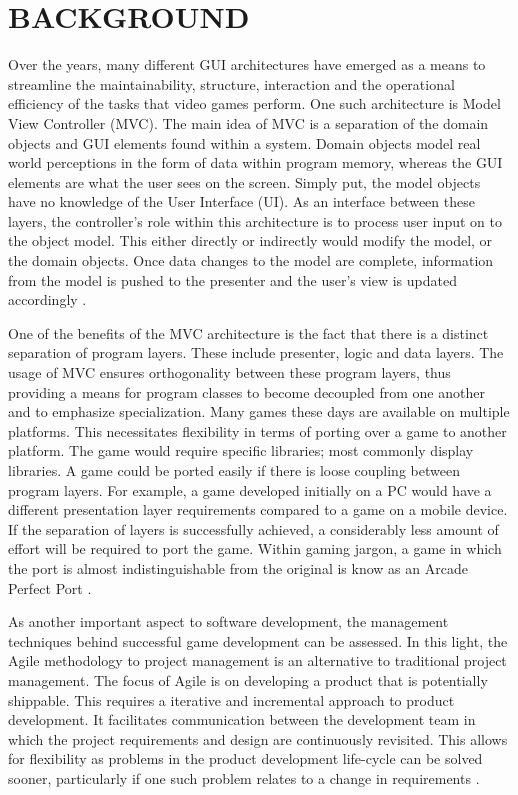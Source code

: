 \documentclass[10pt,twocolumn]{witseiepaper}
\begin{document}
%
\section{BACKGROUND}
\label{sec:Background} %
Over the years, many different GUI architectures have emerged as a means to streamline the maintainability, structure, interaction and the operational efficiency of the tasks that video games perform. One such architecture is Model View Controller (MVC). The main idea of MVC is a separation of the domain objects and GUI elements found within a system. Domain objects model real world perceptions in the form of data within program memory, whereas the GUI elements are what the user sees on the screen. Simply put, the model objects have no knowledge of the User Interface (UI). As an interface between these layers, the controller's role within this architecture is to process user input on to the object model. This either directly or indirectly would modify the model, or the domain objects. Once data changes to the model are complete, information from the model is pushed to the presenter and the user's view is updated accordingly \cite{m-fowler}.

One of the benefits of the MVC architecture is the fact that there is a distinct separation of program layers. These include presenter, logic and data layers. The usage of MVC ensures orthogonality between these program layers, thus  providing a means for program classes to become decoupled from one another and to emphasize specialization. Many games these days are available on multiple platforms. This necessitates flexibility in terms of porting over a game to another platform. The game would require specific libraries; most commonly display libraries. A game could be ported easily if there is loose coupling between program layers. For example, a game developed initially on a PC would have a different presentation layer requirements compared to a game on a mobile device. If the separation of layers is successfully achieved, a considerably less amount of effort will be required to port the game. Within gaming jargon, a game in which the port is almost indistinguishable from the original is know as an Arcade Perfect Port \cite{tv-tropes}.

As another important aspect to software development, the management techniques behind successful game development can be assessed. In this light, the Agile methodology to project management is an alternative to traditional project management. The focus of Agile is on developing a product that is potentially shippable. This requires a iterative and incremental approach to product development. It facilitates communication between the development team in which the project requirements and design are continuously revisited. This allows for flexibility as problems in the product development life-cycle can be solved sooner, particularly if one such problem relates to a change in requirements \cite{agile}.
\end{document}

